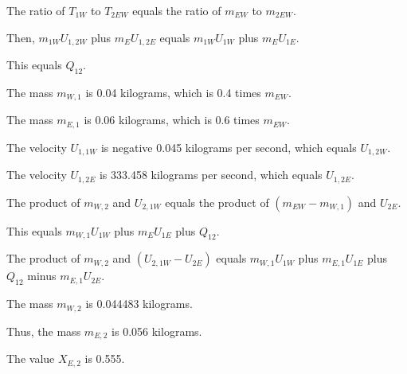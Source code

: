 The ratio of \( T_{1W} \) to \( T_{2EW} \) equals the ratio of \( m_{EW} \) to \( m_{2EW} \).

Then, \( m_{1W} U_{1,2W} \) plus \( m_{E} U_{1,2E} \) equals \( m_{1W} U_{1W} \) plus \( m_{E} U_{1E} \).

This equals \( Q_{12} \).

The mass \( m_{W,1} \) is 0.04 kilograms, which is 0.4 times \( m_{EW} \).

The mass \( m_{E,1} \) is 0.06 kilograms, which is 0.6 times \( m_{EW} \).

The velocity \( U_{1,1W} \) is negative 0.045 kilograms per second, which equals \( U_{1,2W} \).

The velocity \( U_{1,2E} \) is 333.458 kilograms per second, which equals \( U_{1,2E} \).

The product of \( m_{W,2} \) and \( U_{2,1W} \) equals the product of \( (m_{EW} - m_{W,1}) \) and \( U_{2E} \).

This equals \( m_{W,1} U_{1W} \) plus \( m_{E} U_{1E} \) plus \( Q_{12} \).

The product of \( m_{W,2} \) and \( (U_{2,1W} - U_{2E}) \) equals \( m_{W,1} U_{1W} \) plus \( m_{E,1} U_{1E} \) plus \( Q_{12} \) minus \( m_{E,1} U_{2E} \).

The mass \( m_{W,2} \) is 0.044483 kilograms.

Thus, the mass \( m_{E,2} \) is 0.056 kilograms.

The value \( X_{E,2} \) is 0.555.